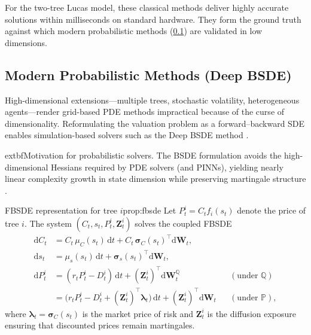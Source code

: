 ﻿\documentclass[11pt,letterpaper,oneside]{article}
\numberwithin{equation}{section}
\newcommand{\1}{\mathbf{1}}
\newcommand{\diff}{\mathrm{d}}
\begin{document}
\begin{tcolorbox}[didacticstyle, title={Computational benchmark}]
For the two-tree Lucas model, these classical methods deliver highly accurate solutions within milliseconds on standard hardware. They form the ground truth against which modern probabilistic methods (\cref{sec:computation_probabilistic}) are validated in low dimensions.
\end{tcolorbox}

\subsection{Modern Probabilistic Methods (Deep BSDE)}\label{sec:computation_probabilistic}
High-dimensional extensions---multiple trees, stochastic volatility, heterogeneous agents---render grid-based PDE methods impractical because of the curse of dimensionality. Reformulating the valuation problem as a forward--backward SDE enables simulation-based solvers such as the Deep BSDE method \cite{han2018solving,huang2025probabilistic}.
\begin{tcolorbox}[literaturestyle]
  	extbf{Motivation for probabilistic solvers.} The BSDE formulation avoids the high-dimensional Hessians required by PDE solvers (and PINNs), yielding nearly linear complexity growth in state dimension while preserving martingale structure \cite{huang2025probabilistic}.
\end{tcolorbox}
\begin{proposition}{FBSDE representation for tree $i$}{prop:fbsde}
Let $P_t^i=C_t f_i(s_t)$ denote the price of tree $i$. The system $(C_t,s_t,P_t^i,\bm{Z}_t^i)$ solves the coupled FBSDE
\begin{align*}
  \diff C_t &= C_t\,\mu_C(s_t)\,\diff t + C_t\,\bm{\sigma}_C(s_t)^{\top}\diff\bm{W}_t,\\
  \diff s_t &= \mu_s(s_t)\,\diff t + \bm{\sigma}_s(s_t)^{\top}\diff\bm{W}_t,\\
  \diff P_t^i &= (r_t P_t^i - D_t^i)\,\diff t + (\bm{Z}_t^i)^{\top}\diff\bm{W}_t^{\mathbb{Q}} && (\text{under }\mathbb{Q})\\
              &= \big(r_t P_t^i - D_t^i + (\bm{Z}_t^i)^{\top}\bm{\lambda}_t\big)\,\diff t + (\bm{Z}_t^i)^{\top}\diff\bm{W}_t && (\text{under }\mathbb{P}),
\end{align*}
where $\bm{\lambda}_t=\bm{\sigma}_C(s_t)$ is the market price of risk and $\bm{Z}_t^i$ is the diffusion exposure ensuring that discounted prices remain martingales.
\end{proposition}
\end{document}
